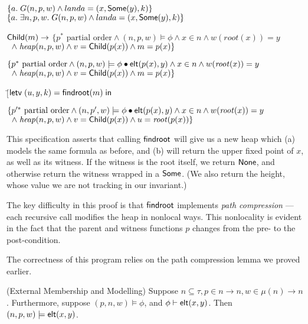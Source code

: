 \begin{specification}
\nextline\> \> $\{a.\;G(n, p, w) \land land a = (x, \mathsf{Some}(y), k)\}$
\nextline\> \> $\{a.\;\exists n, p, w.\; G(n, p, w) \land land a = (x, \mathsf{Some}(y), k)\}$

\nextline\> \> $\mathsf{Child}(m) \to$
\nextline\> \> $\{p^{*} \mbox{ partial order} \land (n, p, w) \models \phi \land
             x \in n \land w(\mathit{root}(x)) = y $ 
\nextline\> \> $\;\;\land\; \mathit{heap}(n, p, w) \land v = \mathsf{Child}(p(x)) \land m = p(x) \}$

\nextline\> \> $\{p^{*} \mbox{ partial order} \land (n, p, w) \models \phi\bullet\mathsf{elt}({p(x)}, {y}) \land
             x \in n \land w(\mathit{root}(x)) = y $ 
\nextline\> \> $\;\;\land\; \mathit{heap}(n, p, w) \land v = \mathsf{Child}(p(x)) \land m = p(x) \}$


\nextline\> \> $[$\=$\mathsf{letv}\;(u, y, k) = \mathsf{findroot}(m)\;\mathsf{in}\;$

\nextline\> \> $\{p'^{*} \mbox{ partial order} \land (n, p', w) \models \phi\bullet\mathsf{elt}({p(x)}, {y}) \land
             x \in n \land w(\mathit{root}(x)) = y $ 
\nextline\> \> $\;\;\land\; \mathit{heap}(n, p, w) \land v = \mathsf{Child}(p(x)) \land u = \mathit{root}(p(x)) \}$



\end{specification}




This specification asserts that calling $\mathsf{findroot}$ will give us a new
heap which (a) models the same formula as before, and (b) will return
the upper fixed point of $x$, as well as its witness. If the witness
is the root itself, we return $\mathsf{None}$, and otherwise return the
witness wrapped in a $\mathsf{Some}$. (We also return the height, whose value
we are not tracking in our invariant.)

The key difficulty in this proof is that $\mathsf{findroot}$ implements
\emph{path compression} --- each recursive call modifies the heap in
nonlocal ways. This nonlocality is evident in the fact that the parent
and witness functions $p$ changes from the pre- to the post-condition.

The correctness of this program relies on the path compression lemma
we proved earlier. 





\begin{lemma}{(External Membership and Modelling)}
Suppose $n \subseteq \tau, p \in n \to n, w \in \mu(n) \to n$. Furthermore,
suppose $(p, n, w) \models \phi$, and ${\phi} \vdash \mathsf{elt}({x}, {y})$. 
Then $(n, p, w) \models \mathsf{elt}({x}, {y})$. 
\end{lemma}


